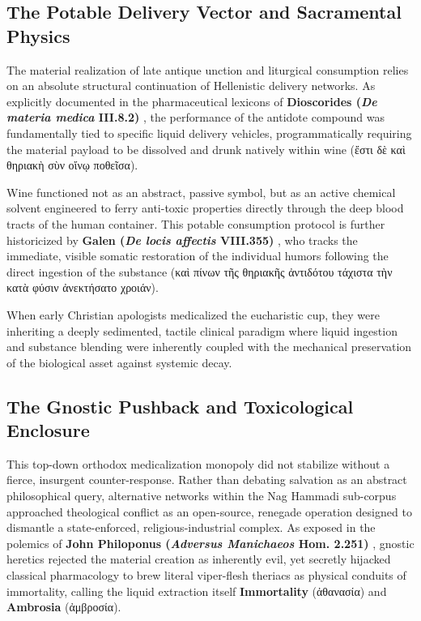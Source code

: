 \documentclass[11pt,twoside,a4paper]{article}
\begin{document}
\subsection{The Potable Delivery Vector and Sacramental Physics}
The material realization of late antique unction and liturgical consumption relies on an absolute structural continuation of Hellenistic delivery networks. As explicitly documented in the pharmaceutical lexicons of \textbf{Dioscorides (\textit{De materia medica} III.8.2)} \cite{dioscorides1906wellmann}, the performance of the antidote compound was fundamentally tied to specific liquid delivery vehicles, programmatically requiring the material payload to be dissolved and drunk natively within wine (\textgreek{ἔστι δὲ καὶ θηριακὴ σὺν οἴνῳ ποθεῖσα}). 

Wine functioned not as an abstract, passive symbol, but as an active chemical solvent engineered to ferry anti-toxic properties directly through the deep blood tracts of the human container. This potable consumption protocol is further historicized by \textbf{Galen (\textit{De locis affectis} VIII.355)} \cite{kuhn1824galen}, who tracks the immediate, visible somatic restoration of the individual humors following the direct ingestion of the substance (\textgreek{καὶ πίνων τῆς θηριακῆς ἀντιδότου τάχιστα τὴν κατὰ φύσιν ἀνεκτήσατο χροιάν}). 

When early Christian apologists medicalized the eucharistic cup, they were inheriting a deeply sedimented, tactile clinical paradigm where liquid ingestion and substance blending were inherently coupled with the mechanical preservation of the biological asset against systemic decay.

\subsection{The Gnostic Pushback and Toxicological Enclosure}
This top-down orthodox medicalization monopoly did not stabilize without a fierce, insurgent counter-response. Rather than debating salvation as an abstract philosophical query, alternative networks within the Nag Hammadi sub-corpus approached theological conflict as an open-source, renegade operation designed to dismantle a state-enforced, religious-industrial complex. As exposed in the polemics of \textbf{John Philoponus (\textit{Adversus Manichaeos} Hom. 2.251)} \cite{philoponus1897gcs}, gnostic heretics rejected the material creation as inherently evil, yet secretly hijacked classical pharmacology to brew literal viper-flesh theriacs as physical conduits of immortality, calling the liquid extraction itself \textbf{Immortality} (\textgreek{ἀθανασία}) and \textbf{Ambrosia} (\textgreek{ἀμβροσία}). 
\end{document}
